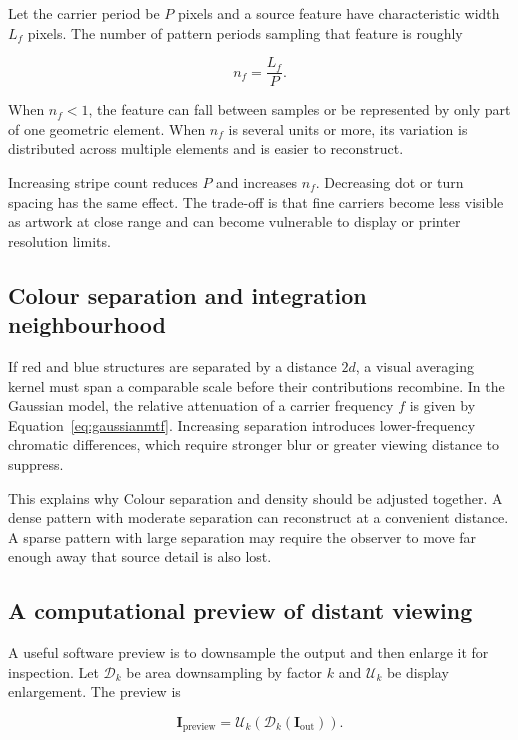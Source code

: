 Let the carrier period be $P$ pixels and a source feature have characteristic width $L_f$ pixels. The number of pattern periods sampling that feature is roughly

\begin{equation}
n_f=\frac{L_f}{P}.
\label{eq:samplesfeature}
\end{equation}

When $n_f<1$, the feature can fall between samples or be represented by only part of one geometric element. When $n_f$ is several units or more, its variation is distributed across multiple elements and is easier to reconstruct.

Increasing stripe count reduces $P$ and increases $n_f$. Decreasing dot or turn spacing has the same effect. The trade-off is that fine carriers become less visible as artwork at close range and can become vulnerable to display or printer resolution limits.

\subsection{Colour separation and integration neighbourhood}

If red and blue structures are separated by a distance $2d$, a visual averaging kernel must span a comparable scale before their contributions recombine. In the Gaussian model, the relative attenuation of a carrier frequency $f$ is given by Equation~\eqref{eq:gaussianmtf}. Increasing separation introduces lower-frequency chromatic differences, which require stronger blur or greater viewing distance to suppress.

This explains why Colour separation and density should be adjusted together. A dense pattern with moderate separation can reconstruct at a convenient distance. A sparse pattern with large separation may require the observer to move far enough away that source detail is also lost.

\subsection{A computational preview of distant viewing}

A useful software preview is to downsample the output and then enlarge it for inspection. Let $\mathcal{D}_k$ be area downsampling by factor $k$ and $\mathcal{U}_k$ be display enlargement. The preview is

\begin{equation}
\mathbf{I}_{\mathrm{preview}}=
\mathcal{U}_k\left(\mathcal{D}_k(\mathbf{I}_{\mathrm{out}})\right).
\label{eq:downsamplepreview}
\end{equation}

